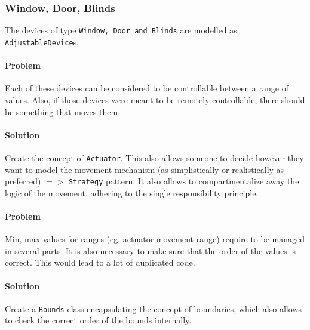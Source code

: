 \subsubsection{Window, Door, Blinds}

The devices of type \texttt{Window, Door and Blinds} are modelled as \texttt{AdjustableDevice}s.

\paragraph{Problem} Each of these devices can be considered to be controllable between a range of values. Also, if those devices
were meant to be remotely controllable, there should be something that moves them.
\paragraph{Solution} Create the concept of \texttt{Actuator}. This also allows someone to decide however they want to model
the movement mechanism (as simplistically or realistically as preferred) $=>$ \texttt{Strategy} pattern.
It also allows to compartmentalize away the logic of the movement, adhering to the single responsibility principle.

\paragraph{Problem} Min, max values for ranges (eg. actuator movement range) require to be managed
in several parts. It is also necessary to make sure that the order of the values is correct.
This would lead to a lot of duplicated code.
\paragraph{Solution} Create a \texttt{Bounds} class encapsulating the concept of boundaries,
which also allows to check the correct order of the bounds internally.

